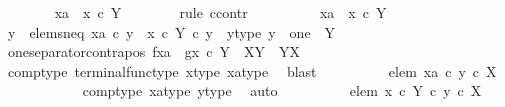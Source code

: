 \begin{isabellebody}
\ \ \ \ \ \ \isamarkupfalse%
\ {\isachardoublequoteopen}xa\ {\isacharequal}{\kern0pt}\ x\ {\isasymcirc}\isactrlsub c\ {\isasymbeta}\isactrlbsub Y\isactrlesub {\isachardoublequoteclose}\isanewline
\ \ \ \ \ \ \isamarkupfalse%
\ {\isacharparenleft}{\kern0pt}rule\ ccontr{\isacharparenright}{\kern0pt}\isanewline
\ \ \ \ \ \ \ \ \isamarkupfalse%
\ {\isachardoublequoteopen}xa\ {\isasymnoteq}\ x\ {\isasymcirc}\isactrlsub c\ {\isasymbeta}\isactrlbsub Y\isactrlesub {\isachardoublequoteclose}\isanewline
\ \ \ \ \ \ \ \ \isamarkupfalse%
\ \isamarkupfalse%
\ y\ \ elems{\isacharunderscore}{\kern0pt}neq{\isacharcolon}{\kern0pt}\ {\isachardoublequoteopen}xa\ {\isasymcirc}\isactrlsub c\ y\ {\isasymnoteq}\ {\isacharparenleft}{\kern0pt}x\ {\isasymcirc}\isactrlsub c\ {\isasymbeta}\isactrlbsub Y\isactrlesub {\isacharparenright}{\kern0pt}\ {\isasymcirc}\isactrlsub c\ y{\isachardoublequoteclose}\ \ y{\isacharunderscore}{\kern0pt}type{\isacharcolon}{\kern0pt}\ {\isachardoublequoteopen}y\ {\isacharcolon}{\kern0pt}\ one\ {\isasymrightarrow}\ Y{\isachardoublequoteclose}\isanewline
\ \ \ \ \ \ \ \ \ \ \isamarkupfalse%
\ one{\isacharunderscore}{\kern0pt}separator{\isacharunderscore}{\kern0pt}contrapos{\isacharbrackleft}{\kern0pt}\ f{\isacharequal}{\kern0pt}xa{\isacharcomma}{\kern0pt}\ \ g{\isacharequal}{\kern0pt}{\isachardoublequoteopen}x\ {\isasymcirc}\isactrlsub c\ {\isasymbeta}\isactrlbsub Y\isactrlesub {\isachardoublequoteclose}{\isacharcomma}{\kern0pt}\ \ X{\isacharequal}{\kern0pt}Y{\isacharcomma}{\kern0pt}\ \ Y{\isacharequal}{\kern0pt}X{\isacharbrackright}{\kern0pt}\isanewline
\ \ \ \ \ \ \ \ \ \ \isamarkupfalse%
\ comp{\isacharunderscore}{\kern0pt}type\ terminal{\isacharunderscore}{\kern0pt}func{\isacharunderscore}{\kern0pt}type\ x{\isacharunderscore}{\kern0pt}type\ xa{\isacharunderscore}{\kern0pt}type\ \isamarkupfalse%
\ blast\isanewline
\ \ \ \ \ \ \ \ \isamarkupfalse%
\ elem{}{\isacharcolon}{\kern0pt}\ {\isachardoublequoteopen}xa\ {\isasymcirc}\isactrlsub c\ y\ {\isasymin}\isactrlsub c\ X{\isachardoublequoteclose}\isanewline
\ \ \ \ \ \ \ \ \ \ \isamarkupfalse%
\ comp{\isacharunderscore}{\kern0pt}type\ xa{\isacharunderscore}{\kern0pt}type\ y{\isacharunderscore}{\kern0pt}type\ \isamarkupfalse%
\ auto\isanewline
\ \ \ \ \ \ \ \ \isamarkupfalse%
\ elem{}{\isacharcolon}{\kern0pt}\ {\isachardoublequoteopen}{\isacharparenleft}{\kern0pt}x\ {\isasymcirc}\isactrlsub c\ {\isasymbeta}\isactrlbsub Y\isactrlesub {\isacharparenright}{\kern0pt}\ {\isasymcirc}\isactrlsub c\ y\ {\isasymin}\isactrlsub c\ X{\isachardoublequoteclose}\isanewline

\end{isabellebody}
